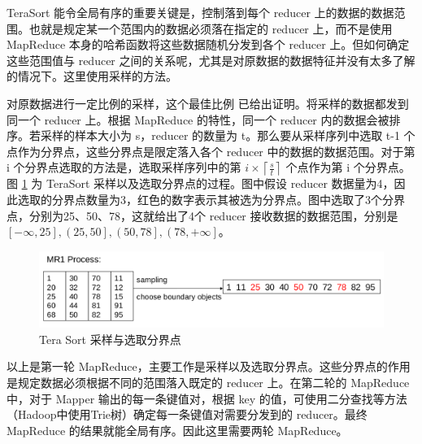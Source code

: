 TeraSort 能令全局有序的重要关键是，控制落到每个 reducer 上的数据的数据范围。也就是规定某一个范围内的数据必须落在指定的 reducer 上，而不是使用 MapReduce 本身的哈希函数将这些数据随机分发到各个 reducer 上。但如何确定这些范围值与 reducer 之间的关系呢，尤其是对原数据的数据特征并没有太多了解的情况下。这里使用采样的方法。

对原数据进行一定比例的采样，这个最佳比例 \cite{tao2013minimal} 已给出证明。将采样的数据都发到同一个 reducer 上。根据 MapReduce 的特性，同一个 reducer 内的数据会被排序。若采样的样本大小为 s，reducer 的数量为 t。那么要从采样序列中选取 t-1 个点作为分界点，这些分界点是限定落入各个 reducer 中的数据的数据范围。对于第 i 个分界点选取的方法是，选取采样序列中的第 $i\times \left \lceil \frac{s}{t} \right \rceil$ 个点作为第 i 个分界点。图 \ref{tera_sort_mr1} 为  TeraSort 采样以及选取分界点的过程。图中假设 reducer 数据量为4，因此选取的分界点数量为3，红色的数字表示其被选为分界点。图中选取了3个分界点，分别为25、50、78，这就给出了4个 reducer 接收数据的数据范围，分别是$\left[- \infty, 25 \right], \left(25, 50 \right], \left(50, 78 \right], \left(78, +\infty \right]$。

\begin{figure}[!htb] 
\centering\includegraphics[width=6in]{picture/ch_terasort_mr/tera_sort_mr1} 
\caption{Tera Sort 采样与选取分界点}\label{tera_sort_mr1} 
\end{figure}

以上是第一轮 MapReduce，主要工作是采样以及选取分界点。这些分界点的作用是规定数据必须根据不同的范围落入既定的 reducer 上。在第二轮的 MapReduce 中，对于 Mapper 输出的每一条键值对，根据 key 的值，可使用二分查找等方法（Hadoop中使用Trie树）确定每一条键值对需要分发到的 reducer。最终 MapReduce 的结果就能全局有序。因此这里需要两轮 MapReduce。
